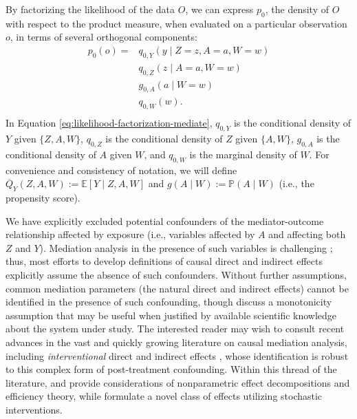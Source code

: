 \documentclass[
  12pt, krantz2,
]{krantz}
\renewcommand{\P}{\mathbb{P}}
\newcommand{\E}{\mathbb{E}}
\newcommand{\1}{\mathbbm{1}}
\theoremstyle{definition}
\theoremstyle{definition}
\theoremstyle{definition}
\theoremstyle{definition}
\theoremstyle{remark}
\begin{document}
By factorizing the likelihood of the data \(O\), we can express \(p_0\), the
density of \(O\) with respect to the product measure, when evaluated on a
particular observation \(o\), in terms of several orthogonal components:
\begin{align}
  p_0(o) = &q_{0,Y}(y \mid Z = z, A = a, W = w) \\ \nonumber
    &q_{0,Z}(z \mid A = a, W = w) \\ \nonumber
    &g_{0,A}(a \mid W = w) \\ \nonumber
    &q_{0,W}(w).\\ \nonumber
  \label{eq:likelihood-factorization-mediate}
\end{align}
In Equation \eqref{eq:likelihood-factorization-mediate}, \(q_{0, Y}\) is the
conditional density of \(Y\) given \(\{Z, A, W\}\), \(q_{0, Z}\) is the conditional
density of \(Z\) given \(\{A, W\}\), \(g_{0, A}\) is the conditional density of \(A\)
given \(W\), and \(q_{0, W}\) is the marginal density of \(W\). For convenience and
consistency of notation, we will define \(\overline{Q}_Y(Z, A, W) := \E[Y \mid Z, A, W]\) and \(g(A \mid W) := \P(A \mid W)\) (i.e., the propensity score).

We have explicitly excluded potential confounders of the mediator-outcome
relationship affected by exposure (i.e., variables affected by \(A\) and affecting
both \(Z\) and \(Y\)). Mediation analysis in the presence of such variables is
challenging \citep{avin2005identifiability}; thus, most efforts to develop
definitions of causal direct and indirect effects explicitly assume the absence
of such confounders. Without further assumptions, common mediation parameters
(the natural direct and indirect effects) cannot be identified in the presence
of such confounding, though \citet{tchetgen2014identification} discuss a monotonicity
assumption that may be useful when justified by available scientific knowledge
about the system under study. The interested reader may wish to consult recent
advances in the vast and quickly growing literature on causal mediation
analysis, including \emph{interventional} direct and indirect effects
\citep{didelez2006direct, vanderweele2014effect, lok2016defining, vansteelandt2017interventional, rudolph2017robust, nguyen2019clarifying},
whose identification is robust to this complex form of post-treatment
confounding. Within this thread of the literature, \citet{diaz2020nonparametric} and
\citet{benkeser2020nonparametric} provide considerations of nonparametric effect
decompositions and efficiency theory, while \citet{hejazi2021nonparametric} formulate a
novel class of effects utilizing stochastic interventions.
\end{document}
